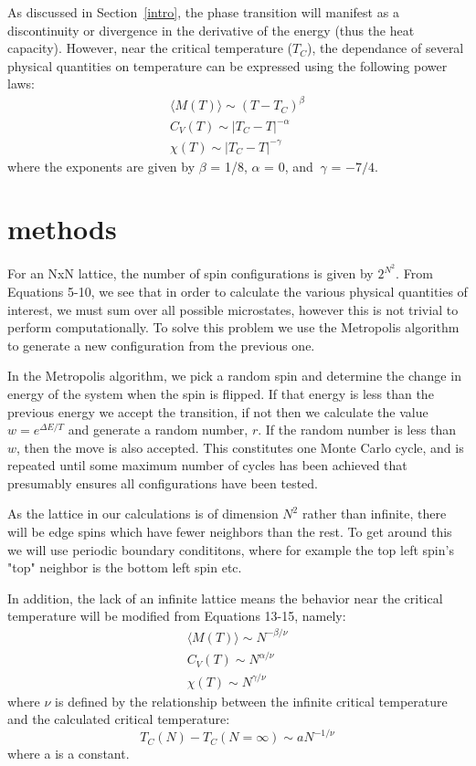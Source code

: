 \documentclass[prc,amsmath,twocolumn,superscriptaddress]{revtex4}
\begin{document}
As discussed in Section~\ref{intro}, the phase transition will manifest as a discontinuity or divergence in the derivative of the energy (thus the heat capacity). However, near the critical temperature ($T_C$), the dependance of several physical quantities on temperature can be expressed using the following power laws:
\begin{gather}
\langle M(T) \rangle \sim (T-T_C)^\beta \\
C_V(T)\sim |T_C -T|^{-\alpha} \\
\chi(T) \sim |T_C-T|^{-\gamma}
\end{gather}
where the exponents are given by $\beta$ = 1/8, $\alpha$ = 0, and $~\gamma$ = $-7/4$.
\section{methods}
\label{methods}
For an NxN lattice, the number of spin configurations is given by $2^{N^2}$. From Equations 5-10, we see that in order to calculate the various physical quantities of interest, we must sum over all possible microstates, however this is not trivial to perform computationally. To solve this problem we use the Metropolis algorithm~\cite{met} to generate a new configuration from the previous one. 

In the Metropolis algorithm, we pick a random spin and determine the change in energy of the system when the spin is flipped. If that energy is less than the previous energy we accept the transition, if not then we calculate the value $w=e^{\Delta E/T}$ and generate a random number, $r$. If the random number is less than $w$, then the move is also accepted. This constitutes one Monte Carlo cycle, and is repeated until some maximum number of cycles has been achieved  that presumably ensures all configurations have been tested.

As the lattice in our calculations is of dimension $N^2$ rather than infinite, there will be edge spins which have fewer neighbors than the rest. To get around this we will use periodic boundary condititons, where for example the top left spin's "top" neighbor is the bottom left spin etc.

In addition, the lack of an infinite lattice means the behavior near the critical temperature will be modified from Equations 13-15, namely:
\begin{gather}
\langle M(T) \rangle \sim N^{-\beta/\nu} \\
C_V(T)\sim N^{\alpha/\nu} \\
\chi(T) \sim N^{\gamma/\nu}
\end{gather}
where $\nu$ is defined by the relationship between the infinite critical temperature and the calculated critical temperature:
\begin{equation}
T_C(N)-T_C(N=\infty) \sim aN^{-1/\nu}
\end{equation}
where a is a constant.
\end{document}
